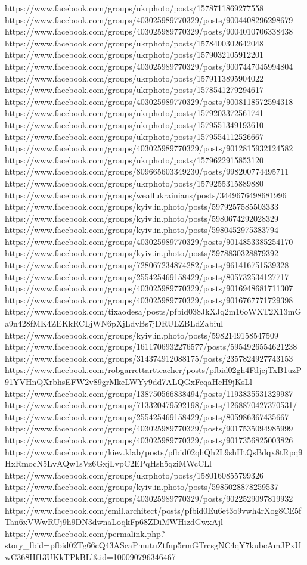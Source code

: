 https://www.facebook.com/groups/ukrphoto/posts/1578711869277558
https://www.facebook.com/groups/403025989770329/posts/9004408296298679
https://www.facebook.com/groups/403025989770329/posts/9004010706338438
https://www.facebook.com/groups/ukrphoto/posts/1578400302642048
https://www.facebook.com/groups/ukrphoto/posts/1579032105912201
https://www.facebook.com/groups/403025989770329/posts/9007447045994804
https://www.facebook.com/groups/ukrphoto/posts/1579113895904022
https://www.facebook.com/groups/ukrphoto/posts/1578541279294617
https://www.facebook.com/groups/403025989770329/posts/9008118572594318
https://www.facebook.com/groups/ukrphoto/posts/1579203372561741
https://www.facebook.com/groups/ukrphoto/posts/1579551349193610
https://www.facebook.com/groups/ukrphoto/posts/1579554112526667
https://www.facebook.com/groups/403025989770329/posts/9012815932124582
https://www.facebook.com/groups/ukrphoto/posts/1579622915853120
https://www.facebook.com/groups/809665603349230/posts/998200774495711
https://www.facebook.com/groups/ukrphoto/posts/1579255315889880
https://www.facebook.com/groups/weallukrainians/posts/3449676498681996
https://www.facebook.com/groups/kyiv.in.photo/posts/5979257585503333
https://www.facebook.com/groups/kyiv.in.photo/posts/5980674292028329
https://www.facebook.com/groups/kyiv.in.photo/posts/5980452975383794
https://www.facebook.com/groups/403025989770329/posts/9014853385254170
https://www.facebook.com/groups/kyiv.in.photo/posts/5978830328879392
https://www.facebook.com/groups/728067234874282/posts/961416751539328
https://www.facebook.com/groups/255425469158429/posts/805732534127717
https://www.facebook.com/groups/403025989770329/posts/9016948681711307
https://www.facebook.com/groups/403025989770329/posts/9016767771729398
https://www.facebook.com/tixaodesa/posts/pfbid038JkXJq2m16oWXT2X13mGa9n428fMK4ZEKkRCLjWN6pXjLdvBs7jDRULZBLdZabiul
https://www.facebook.com/groups/kyiv.in.photo/posts/5982149158547509
https://www.facebook.com/groups/1611706932276577/posts/5954926554621238
https://www.facebook.com/groups/314374912088175/posts/2357824927743153
https://www.facebook.com/robgarrettartteacher/posts/pfbid02gh4FdjcjTxB1uzP91YVHnQXrbhsEFW2v89grMkeLWYy9dd7ALQGxFcqaHcH9jKsLl
https://www.facebook.com/groups/138750566838494/posts/1193835531329987
https://www.facebook.com/groups/713320479592198/posts/1268870427370531/
https://www.facebook.com/groups/255425469158429/posts/805986367435667
https://www.facebook.com/groups/403025989770329/posts/9017535094985999
https://www.facebook.com/groups/403025989770329/posts/9017356825003826
https://www.facebook.com/kiev.klab/posts/pfbid02qhQh2L9shHtQsBdqx8tRpq9HxRmocN5LvAQw1sVz6GxjLvpC2EPqHsh5qziMWcCLl
https://www.facebook.com/groups/ukrphoto/posts/1580160855799326
https://www.facebook.com/groups/kyiv.in.photo/posts/5985028878259537
https://www.facebook.com/groups/403025989770329/posts/9022529097819932
https://www.facebook.com/emil.architect/posts/pfbid0Eu6et3o9vwh4rXog8CE5fTan6xVWwRUj9h9DN3dwnaLoqkFp68ZDiMWHizdGwxAjl
https://www.facebook.com/permalink.php?story_fbid=pfbid02Tg66cQ43AScaPmutuZtfnp5rmGTrcsgNC4qY7kubcAmJPxUwC368Hf13UKkTPkBLl&id=100090796346467

